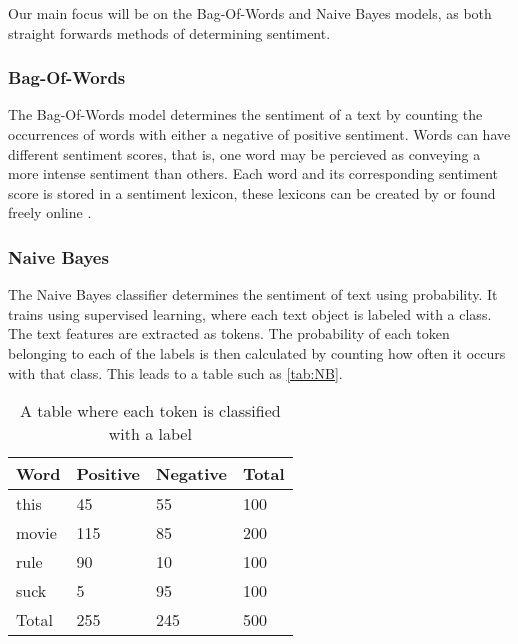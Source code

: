 
Our main focus will be on the Bag-Of-Words and Naive Bayes models, as both
straight forwards methods of determining sentiment.


\subsubsection{Bag-Of-Words}
The Bag-Of-Words model determines the sentiment of a text by
counting the occurrences of words with either a negative of positive sentiment.
Words can have different sentiment scores, that is, one word may be percieved
as conveying a more intense sentiment than others. Each word and its
corresponding sentiment score is stored in a sentiment lexicon, these lexicons
can be created by or found freely online \citep{BagOfWords}.

\subsubsection{Naive Bayes} 
The Naive Bayes classifier determines the sentiment of text
using probability. It trains using supervised learning, where each text object
is labeled with a class. The text features are extracted as tokens.
The probability of each token belonging to each of the labels is then
calculated by counting how often it occurs with that class. This leads to a
table such as \autoref{tab:NB}.

\begin{table}[H]
\centering
\begin{tabular}{|l|l|l|l|}
\hline
Word & Positive & Negative & Total 	\\ \hline
this & 45 & 55 & 100				\\ \hline
movie & 115 & 85 & 200				\\ \hline
rule & 90 & 10 & 100				\\ \hline
suck & 5 & 95 & 100					\\ \hline
Total & 255 & 245 & 500				\\ \hline
\end{tabular}
\caption{A table where each token is classified with a label}
\label{tab:NB}
\end{table}

